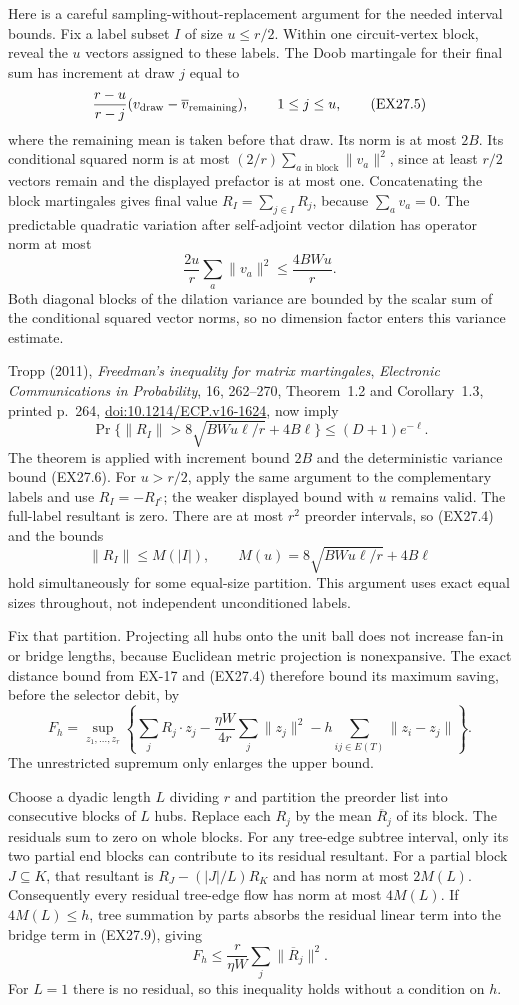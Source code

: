 Here is a careful sampling-without-replacement argument for the
needed interval bounds. Fix a label subset $I$ of size $u\le r/2$.
Within one circuit-vertex block, reveal the $u$ vectors assigned
to these labels. The Doob martingale for their final sum has
increment at draw $j$ equal to
\[
 \frac{r-u}{r-j}
       (v_{\rm draw}-\overline v_{\rm remaining}),
 \qquad 1\le j\le u,
 \tag{EX27.5}
\]
where the remaining mean is taken before that draw. Its norm
is at most $2B$. Its conditional squared norm is at most
$(2/r)\sum_{a\text{ in block}}\|v_a\|^2$, since at least
$r/2$ vectors remain and the displayed prefactor is at most
one. Concatenating the block martingales gives final value
$R_I=\sum_{j\in I}R_j$, because $\sum_av_a=0$.
The predictable quadratic variation after self-adjoint vector
dilation has operator norm at most
\[
 \frac{2u}{r}\sum_a\|v_a\|^2\le\frac{4BWu}{r}.
 \tag{EX27.6}
\]
Both diagonal blocks of the dilation variance are bounded by
the scalar sum of the conditional squared vector norms, so
no dimension factor enters this variance estimate.

Tropp (2011), \emph{Freedman's inequality for matrix martingales},
\emph{Electronic Communications in Probability}, 16, 262--270,
Theorem~1.2 and Corollary~1.3, printed p.~264,
\href{https://doi.org/10.1214/ECP.v16-1624}
{doi:10.1214/ECP.v16-1624}, now imply
\[
 \Pr\{\|R_I\|>8\sqrt{BWu\ell/r}+4B\ell\}
 \le(D+1)e^{-\ell}.
 \tag{EX27.7}
\]
The theorem is applied with increment bound $2B$ and the
deterministic variance bound (EX27.6). For $u>r/2$, apply
the same argument to the complementary labels and use
$R_I=-R_{I^c}$; the weaker displayed bound with $u$ remains
valid. The full-label resultant is zero. There are at most
$r^2$ preorder intervals, so (EX27.4) and the bounds
\[
 \|R_I\|\le M(|I|),\qquad
 M(u)=8\sqrt{BWu\ell/r}+4B\ell
 \tag{EX27.8}
\]
hold simultaneously for some equal-size partition. This
argument uses exact equal sizes throughout, not independent
unconditioned labels.

Fix that partition. Projecting all hubs onto the unit ball
does not increase fan-in or bridge lengths, because Euclidean
metric projection is nonexpansive. The exact distance bound
from EX-17 and (EX27.4) therefore bound its maximum saving,
before the selector debit, by
\[
 F_h=\sup_{z_1,\ldots,z_r}
 \left\{\sum_jR_j\cdot z_j
       -\frac{\eta W}{4r}\sum_j\|z_j\|^2
       -h\sum_{ij\in E(T)}\|z_i-z_j\|\right\}.
 \tag{EX27.9}
\]
The unrestricted supremum only enlarges the upper bound.

Choose a dyadic length $L$ dividing $r$ and partition the
preorder list into consecutive blocks of $L$ hubs. Replace
each $R_j$ by the mean $\overline R_j$ of its block. The
residuals sum to zero on whole blocks. For any tree-edge
subtree interval, only its two partial end blocks can
contribute to its residual resultant. For a partial block
$J\subseteq K$, that resultant is
$R_J-(|J|/L)R_K$ and has norm at most $2M(L)$.
Consequently every residual tree-edge flow has norm at most
$4M(L)$. If $4M(L)\le h$, tree summation by parts absorbs
the residual linear term into the bridge term in (EX27.9),
giving
\[
 F_h\le\frac r{\eta W}\sum_j\|\overline R_j\|^2.
 \tag{EX27.10}
\]
For $L=1$ there is no residual, so this inequality holds
without a condition on $h$.

